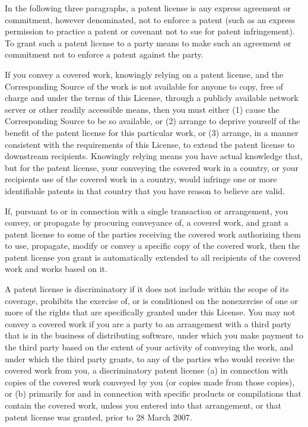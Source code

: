 \documentclass[letterpaper,10pt,english]{sphinxmanual}
\begin{document}
\begin{sphinxVerbatim}[commandchars=\\\{\}]
  In the following three paragraphs, a \PYGZdq{}patent license\PYGZdq{} is any express
agreement or commitment, however denominated, not to enforce a patent
(such as an express permission to practice a patent or covenant not to
sue for patent infringement).  To \PYGZdq{}grant\PYGZdq{} such a patent license to a
party means to make such an agreement or commitment not to enforce a
patent against the party.

  If you convey a covered work, knowingly relying on a patent license,
and the Corresponding Source of the work is not available for anyone
to copy, free of charge and under the terms of this License, through a
publicly available network server or other readily accessible means,
then you must either (1) cause the Corresponding Source to be so
available, or (2) arrange to deprive yourself of the benefit of the
patent license for this particular work, or (3) arrange, in a manner
consistent with the requirements of this License, to extend the patent
license to downstream recipients.  \PYGZdq{}Knowingly relying\PYGZdq{} means you have
actual knowledge that, but for the patent license, your conveying the
covered work in a country, or your recipient\PYGZsq{}s use of the covered work
in a country, would infringe one or more identifiable patents in that
country that you have reason to believe are valid.

  If, pursuant to or in connection with a single transaction or
arrangement, you convey, or propagate by procuring conveyance of, a
covered work, and grant a patent license to some of the parties
receiving the covered work authorizing them to use, propagate, modify
or convey a specific copy of the covered work, then the patent license
you grant is automatically extended to all recipients of the covered
work and works based on it.

  A patent license is \PYGZdq{}discriminatory\PYGZdq{} if it does not include within
the scope of its coverage, prohibits the exercise of, or is
conditioned on the non\PYGZhy{}exercise of one or more of the rights that are
specifically granted under this License.  You may not convey a covered
work if you are a party to an arrangement with a third party that is
in the business of distributing software, under which you make payment
to the third party based on the extent of your activity of conveying
the work, and under which the third party grants, to any of the
parties who would receive the covered work from you, a discriminatory
patent license (a) in connection with copies of the covered work
conveyed by you (or copies made from those copies), or (b) primarily
for and in connection with specific products or compilations that
contain the covered work, unless you entered into that arrangement,
or that patent license was granted, prior to 28 March 2007.


\end{sphinxVerbatim}
\end{document}
